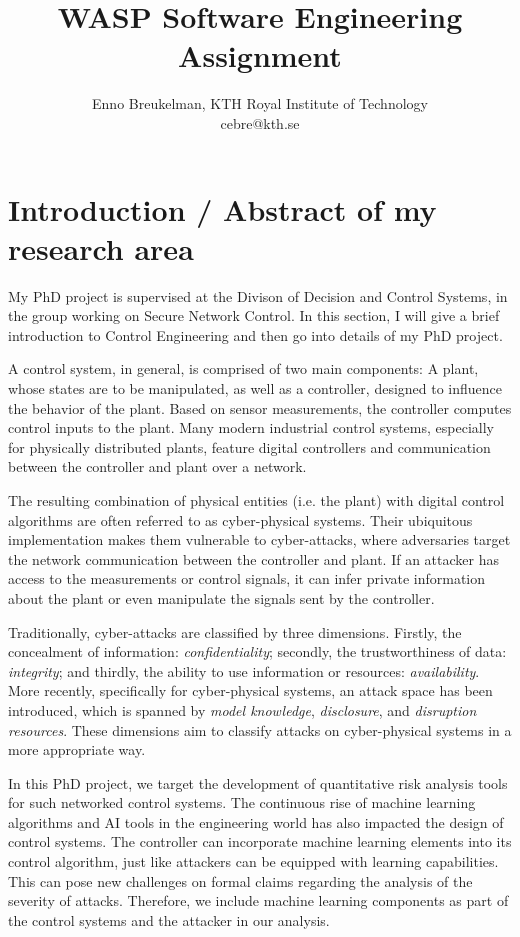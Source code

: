 \documentclass[11pt]{article}
\begin{document}
 
\title{WASP Software Engineering Assignment}
\author{Enno Breukelman, KTH Royal Institute of Technology \\ cebre@kth.se}

\maketitle

\section{Introduction / Abstract of my research area}

My PhD project is supervised at the Divison of Decision and Control Systems, in the group working on Secure Network Control. In this section, I will give a brief introduction to Control Engineering and then go into details of my PhD project.

A control system, in general, is comprised of two main components: A plant, whose states are to be manipulated, as well as a controller, designed to influence the behavior of the plant. Based on sensor measurements, the controller computes control inputs to the plant. Many modern industrial control systems, especially for physically distributed plants, feature digital controllers and communication between the controller and plant over a network. 

The resulting combination of physical entities (i.e. the plant) with digital control algorithms are often referred to as cyber-physical systems. Their ubiquitous implementation makes them vulnerable to cyber-attacks, where adversaries target the network communication between the controller and plant. If an attacker has access to the measurements or control signals, it can infer private information about the plant or even manipulate the signals sent by the controller. 

Traditionally, cyber-attacks are classified by three dimensions. Firstly, the concealment of information: \textit{confidentiality}; secondly, the trustworthiness of data: \textit{integrity}; and thirdly, the ability to use information or resources: \textit{availability}. More recently, specifically for cyber-physical systems, an attack space has been introduced, which is spanned by \textit{model knowledge}, \textit{disclosure}, and \textit{disruption resources}. These dimensions aim to classify attacks on cyber-physical systems in a more appropriate way.

In this PhD project, we target the development of quantitative risk analysis tools for such networked control systems. The continuous rise of machine learning algorithms and AI tools in the engineering world has also impacted the design of control systems. The controller can incorporate machine learning elements into its control algorithm, just like attackers can be equipped with learning capabilities. This can pose new challenges on formal claims regarding the analysis of the severity of attacks. Therefore, we include machine learning components as part of the control systems and the attacker in our analysis. 
\end{document}
